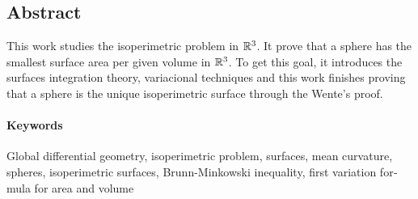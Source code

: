 \begin{otherlanguage}{american}
\section{Abstract}

This work studies the isoperimetric problem in $\mathbb{R}^3$. It prove that a sphere has the smallest surface area per given volume in $\mathbb{R}^3$. To get this goal, it introduces the surfaces integration theory, variacional techniques and this work finishes proving that a sphere is the unique isoperimetric surface through the Wente's proof.



\paragraph{Keywords} Global differential geometry, isoperimetric problem, surfaces, mean curvature, spheres, isoperimetric surfaces, Brunn-Minkowski inequality, first variation formula for area and volume

\end{otherlanguage}
